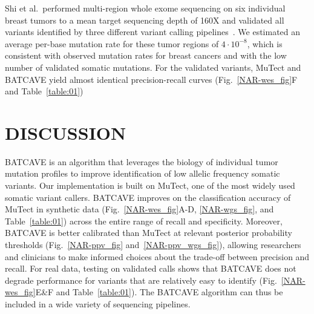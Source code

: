 \documentclass[a4,center,fleqn]{NAR}
\newcommand{\batcave}{BATCAVE\xspace}
\begin{document}
Shi et al.\ performed multi-region whole exome sequencing on six individual breast tumors to a mean target sequencing depth of 160X and validated all variants identified by three different variant calling pipelines~\cite{Shi2018}.
We estimated an average per-base mutation rate for these tumor regions of $4\cdot10^{-8}$, which is consistent with observed mutation rates for breast cancers \citep{Alexandrov2019} and with the low number of validated somatic mutations.
For the validated variants, MuTect and \batcave yield almost identical precision-recall curves (Fig.~\ref{NAR-wes_fig}F and Table~\ref{table:01})

\section{DISCUSSION}
 

\batcave is an algorithm that leverages the biology of individual tumor mutation profiles to improve identification of low allelic frequency somatic variants.
Our implementation is built on MuTect, one of the most widely used somatic variant callers.
\batcave improves on the classification accuracy of MuTect in synthetic data (Fig.~\ref{NAR-wes_fig}A-D,  \ref{NAR-wgs_fig}, and Table~\ref{table:01}) across the entire range of recall and specificity.
Moreover, \batcave is better calibrated than MuTect at relevant posterior probability thresholds (Fig.~\ref{NAR-ppv_fig} and~\ref{NAR-ppv_wgs_fig}), allowing researchers and clinicians to make informed choices about the trade-off between precision and recall.
For real data, testing on validated calls shows that \batcave does not degrade performance for variants that are relatively easy to identify (Fig.~\ref{NAR-wes_fig}E\&F and Table~\ref{table:01}).
The \batcave algorithm can thus be included in a wide variety of sequencing pipelines.
\end{document}
